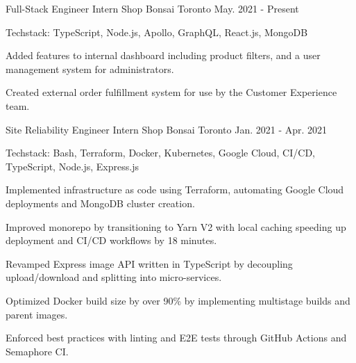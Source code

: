 

\begin{cventries}

  \cventry
    {Full-Stack Engineer Intern} %
    {Shop Bonsai} %
    {Toronto} %
    {May. 2021 - Present} %
    {
      \begin{cvitems} %
        \item {Techstack: TypeScript, Node.js, Apollo, GraphQL, React.js, MongoDB}
        \item {Added features to internal dashboard including product filters, and a user management system for administrators.}
        \item {Created external order fulfillment system for use by the Customer Experience team.}
      \end{cvitems}
    }

  \cventry
    {Site Reliability Engineer Intern} %
    {Shop Bonsai} %
    {Toronto} %
    {Jan. 2021 - Apr. 2021} %
    {
      \begin{cvitems} %
        \item {Techstack: Bash, Terraform, Docker, Kubernetes, Google Cloud, CI/CD, TypeScript, Node.js, Express.js}
        \item {Implemented infrastructure as code using Terraform, automating Google Cloud deployments and MongoDB cluster creation.}
        \item {Improved monorepo by transitioning to Yarn V2 with local caching speeding up deployment and CI/CD workflows by 18 minutes.}
        \item {Revamped Express image API written in TypeScript by decoupling upload/download and splitting into micro-services.}
        \item {Optimized Docker build size by over 90\% by implementing multistage builds and parent images.}
        \item {Enforced best practices with linting and E2E tests through GitHub Actions and Semaphore CI.}
      \end{cvitems}
    }
\end{cventries}
